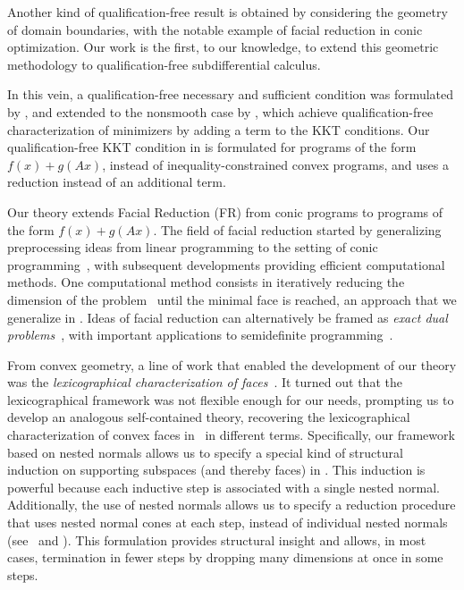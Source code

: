 \documentclass{article}
\theoremstyle{plain}
\theoremstyle{definition}
\theoremstyle{remark}
\begin{document}
Another kind of qualification-free result is obtained by considering the geometry of
domain boundaries, with the notable example of facial reduction in conic optimization. Our work is the first, to our knowledge, to extend this geometric methodology to qualification-free subdifferential calculus.

In this vein, a qualification-free necessary and sufficient condition was formulated
by \textcite{ben-talCharacterizationOptimalityConvex1976}, and extended to
the nonsmooth case by \textcite{wolkowiczGeometryOptimalityConditions1980}, which achieve qualification-free characterization of minimizers by adding a term to the KKT conditions. Our qualification-free KKT condition in 
is formulated for programs of the form $f(x) + g(Ax)$, instead of inequality-constrained convex programs,
and uses a reduction instead of
an additional term.

Our theory extends Facial Reduction (FR) from conic programs to programs of
the form $f(x) + g(Ax)$. The field of facial reduction started by generalizing preprocessing
ideas from linear programming
to the setting of conic programming~\cite{massamOptimalityConditionsConeConvex1979, borweinFacialReductionConeconvex1981, borweinRegularizingAbstractConvex1981},
with subsequent developments 
providing efficient computational methods.
One computational method consists in iteratively reducing the dimension of the
problem~\cite{borweinRegularizingAbstractConvex1981, luoDualityResultsConic1997, wakiFacialReductionAlgorithms2013}
until the minimal face is reached, an approach
that we generalize in .
Ideas of facial reduction can alternatively be framed as
\emph{exact dual problems}~\cite{borweinCharacterizationOptimalityAbstract1981},
with important applications to semidefinite programming~\cite{ramanaExactDualityTheory1997, patakiStrongDualityConic2013}.

From convex geometry, a line of work that enabled the development of our theory was the \emph{lexicographical
characterization of faces}~\cite{martinez-legazLexicographicalSeparationRn1987, martinez-legaz_LEXICOGRAPHICALCHARACTERIZATIONFACES_}. 
It turned out that the
lexicographical framework was not flexible enough for our needs, prompting us to develop an analogous self-contained theory, recovering the lexicographical characterization of convex faces
in~ in different terms.
Specifically, our framework based on nested normals allows us to specify
a special kind of structural induction on supporting subspaces (and thereby faces)
in .
This induction is powerful because each inductive step is associated
with a single nested normal. Additionally, the use of nested normals allows
us to specify a reduction procedure that uses nested normal cones at each
step, instead of individual nested normals (see~ and ). This formulation provides structural insight and allows, in most cases, termination in fewer steps by dropping many dimensions at once in some steps.
\end{document}
